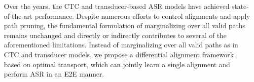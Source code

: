 Over the years, the CTC and transducer-based ASR models have achieved state-of-the-art performance.
Despite numerous efforts to control alignments and apply path pruning, the fundamental formulation of marginalizing over all valid paths remains unchanged and directly or indirectly contributes to several of the aforementioned limitations.
Instead of marginalizing over all valid paths as in CTC and transducer models, we propose a differential alignment framework based on optimal transport, which can jointly learn a single alignment and perform ASR in an E2E manner.

 








